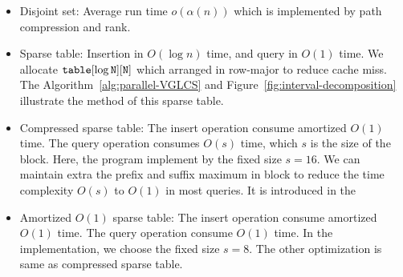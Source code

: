 \begin{itemize}
  \item 

Disjoint set: Average run time $o(\alpha(n))$ which is implemented by
path compression and rank.

  \item 

Sparse table: Insertion in $O(\log n)$ time, and query in $O(1)$ time.
We allocate $\tt{table}[\log N][N]$ which arranged in row-major to
reduce cache miss.  The Algorithm~\ref{alg:parallel-VGLCS} and
Figure~\ref{fig:interval-decomposition} illustrate the method of this
sparse table.



  \item 

Compressed sparse table: The insert operation consume amortized
$O(1)$ time.  The query operation consumes $O(s)$ time, which $s$ is the
size of the block.  Here, the program implement by the fixed size $s =
16$.  We can maintain extra the prefix and suffix maximum in block to
reduce the time complexity $O(s)$ to $O(1)$ in most queries.  It is introduced in the 

  \item

Amortized $O(1)$ sparse table:  The insert operation consume amortized
$O(1)$ time.  The query operation consume $O(1)$ time.  In the
implementation, we choose the fixed size $s = 8$.  The other
optimization is same as compressed sparse table.

\end{itemize}

\iffalse
\begin{itemize}
  \item 并查集 (Disjoint Set): 平均運行時間 $o(\alpha(n))$。只使用路徑壓縮技巧。
  \item 稀疏表 (Sparse Table): 插入 $O(\log n)$、詢問 $O(1)$。實作陣列宣告採用 $\tt{table}[\log N][N]$ 以減少快取未中。
  \item 樹狀數組 (Binary Indexed Tree): 插入、詢問均為 $O(\log n)$。
  \item 壓縮稀疏表 (Compressed Sparse Tree): 插入均攤 $O(1)$、詢問操作 $O(s)$，
  其中 $s$ 為拆分到區塊大小。實作時，維護區塊前綴和後綴最大值降低詢問複雜度至 $O(1)$，當發生 in-block 詢問再運行 $O(s)$ 算法。
\end{itemize}
\fi

